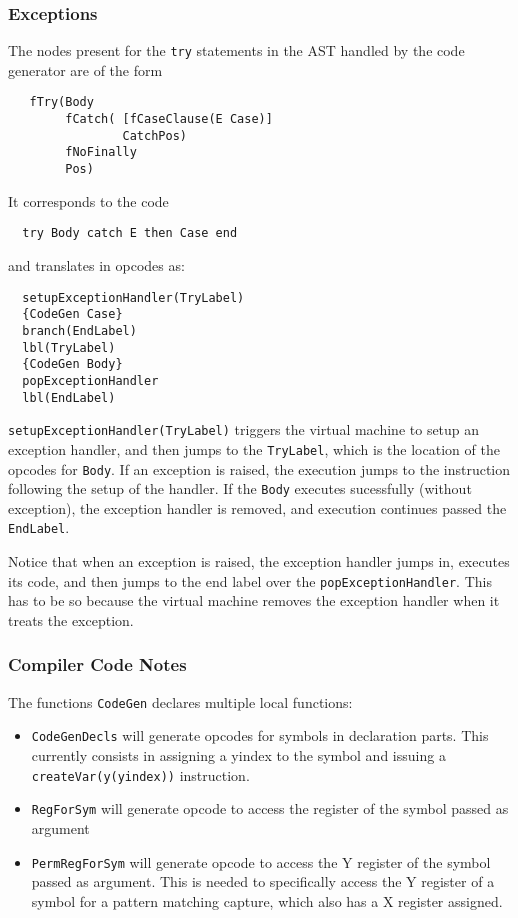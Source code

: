 \documentclass[a4paper]{memoir}
\begin{document}
\subsubsection{Exceptions}\label{sec:arch:codegen:exceptions}
The nodes present for the \lstinline!try! statements in the AST handled by the
code generator are of the form
\begin{lstlisting}
   fTry(Body 
        fCatch( [fCaseClause(E Case)] 
                CatchPos) 
        fNoFinally 
        Pos)
\end{lstlisting}
It corresponds to the code
\begin{lstlisting}
  try Body catch E then Case end
\end{lstlisting}
and translates in opcodes as:
\begin{lstlisting}
  setupExceptionHandler(TryLabel)
  {CodeGen Case}
  branch(EndLabel)
  lbl(TryLabel)
  {CodeGen Body}
  popExceptionHandler
  lbl(EndLabel)
\end{lstlisting}

\lstinline!setupExceptionHandler(TryLabel)! triggers the virtual machine to setup an
exception handler, and then jumps to the \lstinline!TryLabel!, which is the
location of the opcodes for \lstinline!Body!. If an exception is raised, the
execution jumps to the instruction following the setup of the handler. If the
\lstinline!Body! executes sucessfully (without exception), the exception handler
is removed, and execution continues passed the \lstinline!EndLabel!.

Notice that when an exception is raised, the exception handler jumps in,
executes its code, and then jumps to the end label over the
\lstinline!popExceptionHandler!. This has to be so because the virtual
machine removes the exception handler when it treats the exception.


\subsubsection{Compiler Code Notes}
The functions \lstinline!CodeGen! declares multiple local functions:
\begin{itemize}
  \item \lstinline!CodeGenDecls! will generate opcodes for symbols in
    declaration parts. This currently consists in assigning a yindex to the
    symbol and issuing a \lstinline!createVar(y(yindex))! instruction.
  \item \lstinline!RegForSym! will generate opcode to access the register of the
    symbol passed as argument
  \item \lstinline!PermRegForSym! will generate opcode to access the Y register
    of the symbol passed as argument. This is needed to specifically access the
    Y register of a symbol for a pattern matching capture, which also has a X
    register assigned.
\end{itemize}
\end{document}
